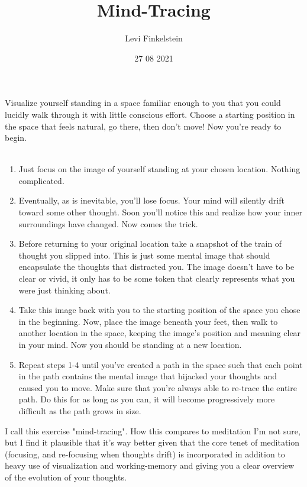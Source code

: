 \title{Mind-Tracing}
\author{Levi Finkelstein}
\date{27 08 2021}

\maketitle

Visualize yourself standing in a space familiar enough to you that you could lucidly walk through it with little conscious effort. Choose a starting position in the space that feels natural, go there, then don't move! Now you're ready to begin.
\\\\
\begin{enumerate}
    \item Just focus on the image of yourself standing at your chosen location. Nothing complicated.
    \item  Eventually, as is inevitable, you'll lose focus. Your mind will silently drift toward some other thought. Soon you'll notice this and realize how your inner surroundings have changed. Now comes the trick.
    \item  Before returning to your original location take a snapshot of the train of thought you slipped into. This is just some mental image that should encapsulate the thoughts that distracted you. The image doesn't have to be clear or vivid, it only has to be some token that clearly represents what you were just thinking about.
    \item  Take this image back with you to the starting position of the space you chose in the beginning. Now, place the image beneath your feet, then walk to another location in the space, keeping the image's position and meaning clear in your mind. Now you should be standing at a new location.
    \item Repeat steps 1-4 until you've created a path in the space such that each point in the path contains the mental image that hijacked your thoughts and caused you to move. Make sure that you're always able to re-trace the entire path. Do this for as long as you can, it will become progressively more difficult as the path grows in size.
 
\end{enumerate}
 I call this exercise "mind-tracing". How this compares to meditation I'm not sure, but I find it plausible that it's way better given that the core tenet of meditation (focusing, and re-focusing when thoughts drift) is incorporated in addition to heavy use of visualization and working-memory and giving you a clear overview of the evolution of your thoughts.


